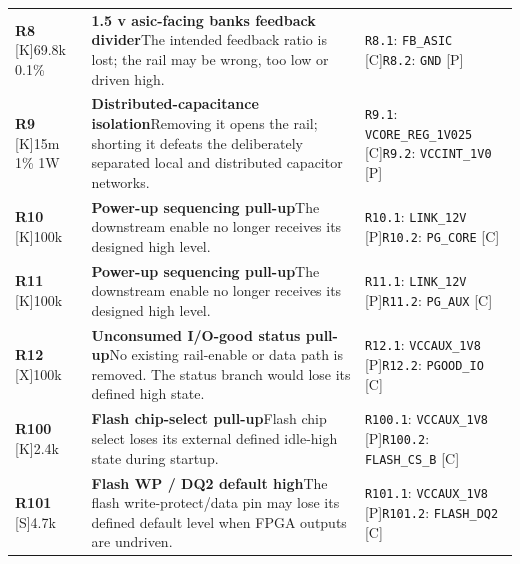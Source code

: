 \documentclass[11pt,a4paper]{article}
\begin{document}
\begin{longtable}{@{}P{27mm}P{77mm}P{62mm}@{}}
\textbf{R8} [K]\newline 69.8k 0.1\% & \textbf{1.5 v asic-facing banks feedback divider}\newline The intended feedback ratio is lost; the rail may be wrong, too low or driven high. & \nolinkurl{R8.1}: \nolinkurl{FB_ASIC} [C]\newline \nolinkurl{R8.2}: \nolinkurl{GND} [P] \\
\textbf{R9} [K]\newline 15m 1\% 1W & \textbf{Distributed-capacitance isolation}\newline Removing it opens the rail; shorting it defeats the deliberately separated local and distributed capacitor networks. & \nolinkurl{R9.1}: \nolinkurl{VCORE_REG_1V025} [C]\newline \nolinkurl{R9.2}: \nolinkurl{VCCINT_1V0} [P] \\
\textbf{R10} [K]\newline 100k & \textbf{Power-up sequencing pull-up}\newline The downstream enable no longer receives its designed high level. & \nolinkurl{R10.1}: \nolinkurl{LINK_12V} [P]\newline \nolinkurl{R10.2}: \nolinkurl{PG_CORE} [C] \\
\textbf{R11} [K]\newline 100k & \textbf{Power-up sequencing pull-up}\newline The downstream enable no longer receives its designed high level. & \nolinkurl{R11.1}: \nolinkurl{LINK_12V} [P]\newline \nolinkurl{R11.2}: \nolinkurl{PG_AUX} [C] \\
\textbf{R12} [X]\newline 100k & \textbf{Unconsumed I/O-good status pull-up}\newline No existing rail-enable or data path is removed. The status branch would lose its defined high state. & \nolinkurl{R12.1}: \nolinkurl{VCCAUX_1V8} [P]\newline \nolinkurl{R12.2}: \nolinkurl{PGOOD_IO} [C] \\
\textbf{R100} [K]\newline 2.4k & \textbf{Flash chip-select pull-up}\newline Flash chip select loses its external defined idle-high state during startup. & \nolinkurl{R100.1}: \nolinkurl{VCCAUX_1V8} [P]\newline \nolinkurl{R100.2}: \nolinkurl{FLASH_CS_B} [C] \\
\textbf{R101} [S]\newline 4.7k & \textbf{Flash WP / DQ2 default high}\newline The flash write-protect/data pin may lose its defined default level when FPGA outputs are undriven. & \nolinkurl{R101.1}: \nolinkurl{VCCAUX_1V8} [P]\newline \nolinkurl{R101.2}: \nolinkurl{FLASH_DQ2} [C] \\

\end{longtable}
\end{document}
